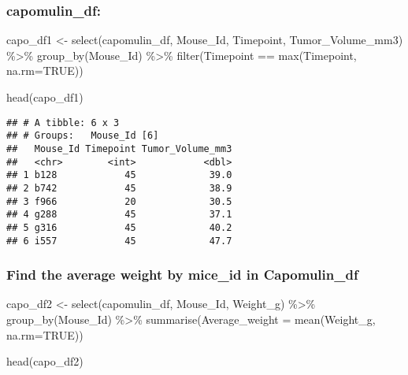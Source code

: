 \documentclass[
]{article}
\newenvironment{Shaded}{\begin{snugshade}}{\end{snugshade}}
\newcommand{\AttributeTok}[1]{\textcolor[rgb]{0.77,0.63,0.00}{#1}}
\newcommand{\ConstantTok}[1]{\textcolor[rgb]{0.00,0.00,0.00}{#1}}
\newcommand{\FunctionTok}[1]{\textcolor[rgb]{0.00,0.00,0.00}{#1}}
\newcommand{\NormalTok}[1]{#1}
\newcommand{\OtherTok}[1]{\textcolor[rgb]{0.56,0.35,0.01}{#1}}
\newcommand{\SpecialCharTok}[1]{\textcolor[rgb]{0.00,0.00,0.00}{#1}}
\begin{document}
\hypertarget{capomulin_df}{%
\subsubsection{capomulin\_df:}\label{capomulin_df}}

\begin{Shaded}
\begin{Highlighting}[]
\NormalTok{capo\_df1 }\OtherTok{\textless{}{-}} \FunctionTok{select}\NormalTok{(capomulin\_df, Mouse\_Id, Timepoint, Tumor\_Volume\_mm3) }\SpecialCharTok{\%\textgreater{}\%}
  \FunctionTok{group\_by}\NormalTok{(Mouse\_Id) }\SpecialCharTok{\%\textgreater{}\%}
  \FunctionTok{filter}\NormalTok{(Timepoint }\SpecialCharTok{==} \FunctionTok{max}\NormalTok{(Timepoint, }\AttributeTok{na.rm=}\ConstantTok{TRUE}\NormalTok{))}

\FunctionTok{head}\NormalTok{(capo\_df1)}
\end{Highlighting}
\end{Shaded}

\begin{verbatim}
## # A tibble: 6 x 3
## # Groups:   Mouse_Id [6]
##   Mouse_Id Timepoint Tumor_Volume_mm3
##   <chr>        <int>            <dbl>
## 1 b128            45             39.0
## 2 b742            45             38.9
## 3 f966            20             30.5
## 4 g288            45             37.1
## 5 g316            45             40.2
## 6 i557            45             47.7
\end{verbatim}

\hypertarget{find-the-average-weight-by-mice_id-in-capomulin_df}{%
\subsubsection{Find the average weight by mice\_id in
Capomulin\_df}\label{find-the-average-weight-by-mice_id-in-capomulin_df}}

\begin{Shaded}
\begin{Highlighting}[]
\NormalTok{capo\_df2 }\OtherTok{\textless{}{-}} \FunctionTok{select}\NormalTok{(capomulin\_df, Mouse\_Id, Weight\_g) }\SpecialCharTok{\%\textgreater{}\%}
  \FunctionTok{group\_by}\NormalTok{(Mouse\_Id) }\SpecialCharTok{\%\textgreater{}\%}
 \FunctionTok{summarise}\NormalTok{(}\AttributeTok{Average\_weight =} \FunctionTok{mean}\NormalTok{(Weight\_g, }\AttributeTok{na.rm=}\ConstantTok{TRUE}\NormalTok{))}

\FunctionTok{head}\NormalTok{(capo\_df2)}
\end{Highlighting}
\end{Shaded}
\end{document}
